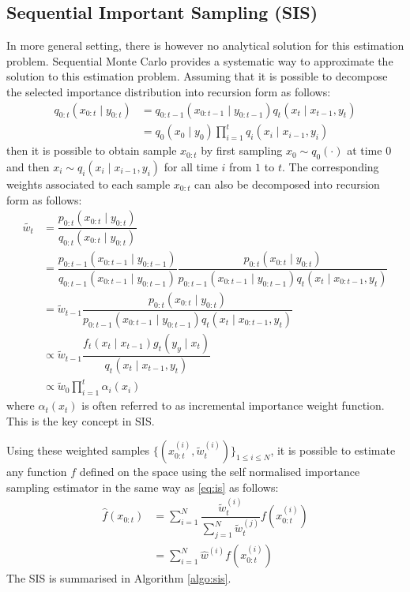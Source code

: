 \subsection{Sequential Important Sampling (SIS)}
\label{sec:SIS}
In more general setting, there is however no analytical solution for this estimation problem. Sequential Monte Carlo provides a systematic way to approximate the solution to this estimation problem. Assuming that it is possible to decompose the selected importance distribution into recursion form as follows:
\begin{align}
	q_{0:t}(x_{0:t} \mid y_{0:t}) &= q_{0:t-1}(x_{0:t-1} \mid y_{0:t-1}) q_t(x_t \mid x_{t-1}, y_t) \nonumber \\
	             &= q_0(x_0 \mid y_0) \prod^t_{i=1} q_i(x_i \mid x_{i-1}, y_{i})
\label{eq:q}
\end{align}
then it is possible to obtain sample ${x_{0:t}}$ by first sampling $x_0 \sim q_0(\cdot)$ at time $0$ and then $x_i \sim q_i(x_i \mid x_{i-1}, y_i)$ for all time $i$ from $1$ to $t$. The corresponding weights associated to each sample $x_{0:t}$ can also be decomposed into recursion form as follows:
\begin{align}
  \tilde{w_t} &= \dfrac{p_{0:t}(x_{0:t} \mid y_{0:t})}{q_{0:t}(x_{0:t} \mid y_{0:t})} \nonumber \\
              &= \dfrac{p_{0:t-1}(x_{0:t-1} \mid y_{0:t-1})}{q_{0:t-1}(x_{0:t-1} \mid y_{0:t-1})} \dfrac{p_{0:t}(x_{0:t} \mid y_{0:t})}{p_{0:t-1}(x_{0:t-1} \mid y_{0:t-1})q_t(x_t \mid x_{0:t-1}, y_t)} \nonumber \\
              &= \tilde{w}_{t-1} \dfrac{p_{0:t}(x_{0:t} \mid y_{0:t})}{p_{0:t-1}(x_{0:t-1} \mid y_{0:t-1})q_t(x_t \mid x_{0:t-1}, y_t)} \nonumber \\
              &\propto \tilde{w}_{t-1} \dfrac{f_t(x_t \mid x_{t-1})g_t(y_y \mid x_t)}{q_t(x_t \mid x_{t-1}, y_t)} \label{eq:w} \\
              &\propto \tilde{w}_0 \prod^t_{i=1} \alpha_i(x_{i})          
\end{align}
where $\alpha_t(x_{t})$  is often referred to as incremental importance weight function. This is the key concept in SIS.

Using these weighted samples $\{(x^{(i)}_{0:t}, \tilde{w}^{(i)}_t)\}_{1 \leq i \leq N}$, it is possible to estimate any function $f$ defined on the space using the self normalised importance sampling estimator in the same way as \eqref{eq:is} as follows:
\begin{align}
  \hat{f}(x_{0:t}) &= \sum^N_{i=1} \dfrac{\tilde{w}^{(i)}_t}{\sum^N_{j=1}\tilde{w}^{(j)}_t} f(x^{(i)}_{0:t}) \nonumber \\
   &= \sum^N_{i=1} \hat{w}^{(i)} f(x^{(i)}_{0:t})
\end{align}
The SIS is summarised in Algorithm \ref{algo:sis}.

